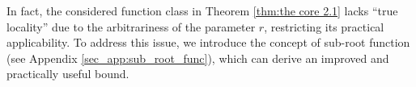 \documentclass{article}
\newtheorem{lemma}{Lemma}
\begin{document}
In fact, the considered function class in Theorem \ref{thm:the core 2.1} lacks ``true locality'' due to the arbitrariness of the parameter $r$, restricting its practical applicability.
To address this issue, we introduce the concept of sub-root function (see Appendix \ref{sec_app:sub_root_func}), which can derive an improved and practically useful bound.
\end{document}
